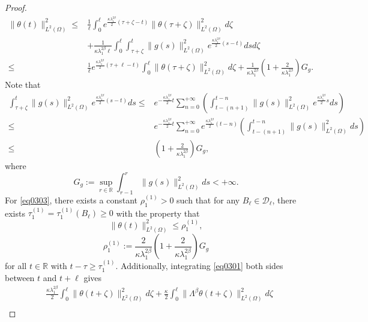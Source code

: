 \documentclass[oneside,preprint,12pt,numbers,sort&compress]{elsarticle}
\begin{document}
\begin{proof}
\begin{equation}
\begin{aligned}
   \|\theta(t)\|_{L^2(\Omega)}^2
   \leq & \frac{1}{\ell} \int_{0}^{\ell} e^{\frac{\kappa\lambda_{1}^{2\beta}}{2}(\tau+\zeta-t)} \|\theta(\tau+\zeta)\|_{L^2(\Omega)}^2 d\zeta \\
   & + \frac{1}{\kappa\lambda_{1}^{2\beta}\ell} \int_{0}^{\ell} \int_{\tau+\zeta}^{t} \|g(s)\|_{L^2(\Omega)}^2 e^{\frac{\kappa\lambda_{1}^{2\beta}}{2}(s-t)} ds d\zeta \\
   \leq & \frac{1}{\ell} e^{\frac{\kappa\lambda_{1}^{2\beta}}{2}(\tau+\ell-t)}  \int_{0}^{\ell} \|\theta(\tau+\zeta)\|_{L^2(\Omega)}^2 d\zeta + \frac{1}{\kappa\lambda_{1}^{2\beta}} \left(1+\frac{2}{\kappa\lambda_{1}^{2\beta}}\right)G_g.
\end{aligned}
\end{equation}
Note that
\begin{align*}
   \int_{\tau+\zeta}^{t} \|g(s)\|_{L^2(\Omega)}^2 e^{\frac{\kappa\lambda_{1}^{2\beta}}{2}(s-t)} ds
   \leq & e^{-\frac{\kappa\lambda_{1}^{2\beta}}{2}t} \sum_{n=0}^{+\infty} \left(\int_{t-(n+1)}^{t-n} \|g(s)\|_{L^2(\Omega)}^2 e^{\frac{\kappa\lambda_{1}^{2\beta}}{2}s} ds\right) \\
   \leq & e^{-\frac{\kappa\lambda_{1}^{2\beta}}{2}t} \sum_{n=0}^{+\infty} e^{\frac{\kappa\lambda_{1}^{2\beta}}{2}(t-n)} \left(\int_{t-(n+1)}^{t-n} \|g(s)\|_{L^2(\Omega)}^2 ds\right) \\
   \leq & \left(1+\frac{2}{\kappa\lambda_{1}^{2\beta}}\right)G_g,
\end{align*}
where
$$
G_g:=\sup_{r \in \mathbb{R}}\int_{r-1}^{r}\|g(s)\|_{L^2(\Omega)}^2 ds< +\infty.
$$
For \cref{eq0303}, there exists a constant $\rho_{1}^{(1)} > 0$ such that for any $B_{\ell} \in \mathcal{D}_{\ell}$, there exists $\tau_{1}^{(1)} = \tau_{1}^{(1)}(B_{\ell}) \geq 0$ with the property that 
\begin{equation}\label{eq0317}
    \|\theta(t)\|_{L^2(\Omega)}^2
   \leq 
   \rho_{1}^{(1)},
\end{equation}
\[   
   \rho_{1}^{(1)}
   :=  
   \frac{2}{\kappa\lambda_{1}^{2\beta}} \left(1+\frac{2}{\kappa\lambda_{1}^{2\beta}}\right)G_g
\]
for all $t \in \mathbb{R}$ with $t - \tau \geq \tau_{1}^{(1)}$. Additionally, integrating \cref{eq0301} both sides between $t$ and $t+\ell$ gives
\begin{equation}\label{eq0307}
\begin{aligned}
    & \frac{\kappa\lambda_1^{2\beta}}{2} \int_{0}^{\ell} \|\theta(t+\zeta)\|_{L^2(\Omega)}^2 d\zeta 
    + 
    \frac{\kappa}{2} \int_{0}^{\ell} \| \Lambda^\beta \theta(t+\zeta)\|_{L^2(\Omega)}^2 d\zeta \\

\end{aligned}
\end{equation}
\end{proof}
\end{document}
